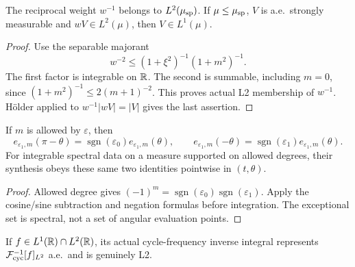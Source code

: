 \begin{lemma}
\label{lem:cylinder-spectral-mass}
\leanok
The reciprocal weight $w^{-1}$ belongs to $L^2(\mu_{\rm sp})$.
If $\mu\le\mu_{\rm sp}$, $V$ is a.e.\ strongly measurable and
$wV\in L^2(\mu)$, then $V\in L^1(\mu)$.
\end{lemma}

\begin{proof}
\leanok
Use the separable majorant
\[
 w^{-2}\le(1+\xi^2)^{-1}(1+m^2)^{-1}.
\]
The first factor is integrable on $\mathbb{R}$. The second is summable, including
$m=0$, since $(1+m^2)^{-1}\le2(m+1)^{-2}$.
This proves actual L2 membership of $w^{-1}$.
Hölder applied to $w^{-1}|wV|=|V|$ gives the last assertion.
\end{proof}

\begin{lemma}
\label{lem:cylinder-trig-parity}
\leanok
If $m$ is allowed by $\varepsilon$, then
\[
 e_{\varepsilon_1,m}(\pi-\theta)
  =\operatorname{sgn}(\varepsilon_0)e_{\varepsilon_1,m}(\theta),\qquad
 e_{\varepsilon_1,m}(-\theta)
  =\operatorname{sgn}(\varepsilon_1)e_{\varepsilon_1,m}(\theta).
\]
For integrable spectral data on a measure supported on allowed degrees,
their synthesis obeys these same two identities pointwise in $(t,\theta)$.
\end{lemma}

\begin{proof}
\leanok
Allowed degree gives $(-1)^m=\operatorname{sgn}(\varepsilon_0)
\operatorname{sgn}(\varepsilon_1)$.
Apply the cosine/sine subtraction and negation formulas before integration.
The exceptional set is spectral, not a set of angular evaluation points.
\end{proof}

\begin{lemma}
\label{lem:l2-inverse-fourier-integral}
\leanok
If $f\in L^1(\mathbb{R})\cap L^2(\mathbb{R})$, its actual cycle-frequency inverse integral
represents $\mathcal F_{\rm cyc}^{-1}[f]_{L^2}$ a.e.\ and is genuinely L2.
\end{lemma}

